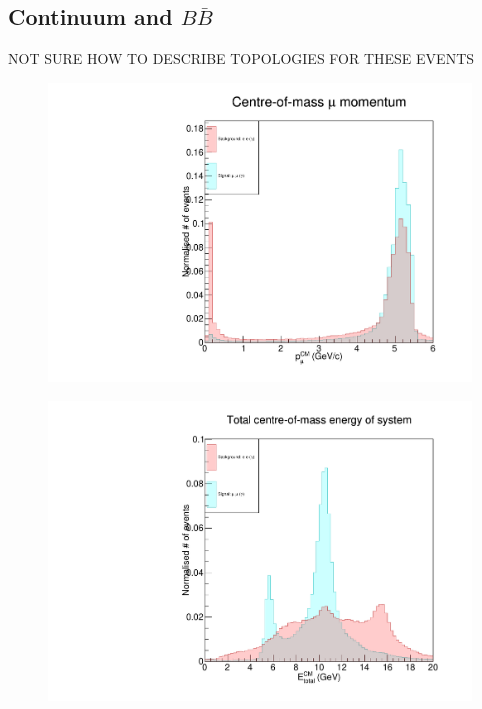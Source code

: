 \documentclass[12pt]{thesis}  %
\begin{document}
\subsection{Continuum and $B\bar{B}$}

NOT SURE HOW TO DESCRIBE TOPOLOGIES FOR THESE EVENTS


\begin{figure}[h]
\centering
\begin{minipage}{.5\textwidth}
  \centering
  \includegraphics[width=\linewidth]{images/bhabha-mupair-muCM_P.pdf}
  \label{fig:test1}
\end{minipage}%
\begin{minipage}{.5\textwidth}
  \centering
  \includegraphics[width=\linewidth]{images/bhabha-mupair-totalCM_E.pdf}
  \label{fig:test2}
\end{minipage}
\end{figure}
\end{document}
